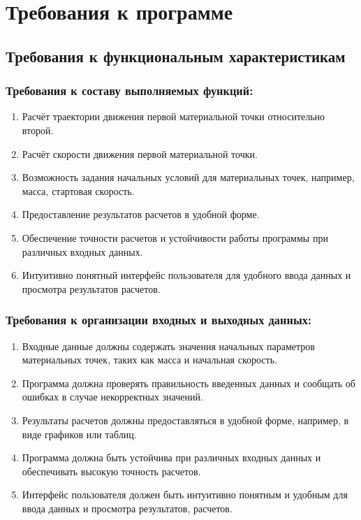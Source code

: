  \section{Требования к программе}
 \subsection{Требования к функциональным характеристикам}

 \subsubsection{Требования к составу выполняемых функций:}

 \begin{enumerate}
  \item Расчёт траектории движения первой материальной точки относительно второй.
  \item Расчёт скорости движения первой материальной точки.
  \item Возможность задания начальных условий для материальных точек, например, масса, стартовая скорость.
  \item Предоставление результатов расчетов в удобной форме.
  \item Обеспечение точности расчетов и устойчивости работы программы при различных входных данных.
  \item Интуитивно понятный интерфейс пользователя для удобного ввода данных и просмотра результатов расчетов.
 \end{enumerate}

 \subsubsection{Требования к организации входных и выходных данных:}

 \begin{enumerate}
  \item Входные данные должны содержать значения начальных параметров материальных точек, таких как масса и начальная скорость.
  \item Программа должна проверять правильность введенных данных и сообщать об ошибках в случае некорректных значений.
  \item Результаты расчетов должны предоставляться в удобной форме, например, в виде графиков или таблиц.
  \item Программа должна быть устойчива при различных входных данных и обеспечивать высокую точность расчетов.
  \item Интерфейс пользователя должен быть интуитивно понятным и удобным для ввода данных и просмотра результатов, расчетов.
 \end{enumerate}

